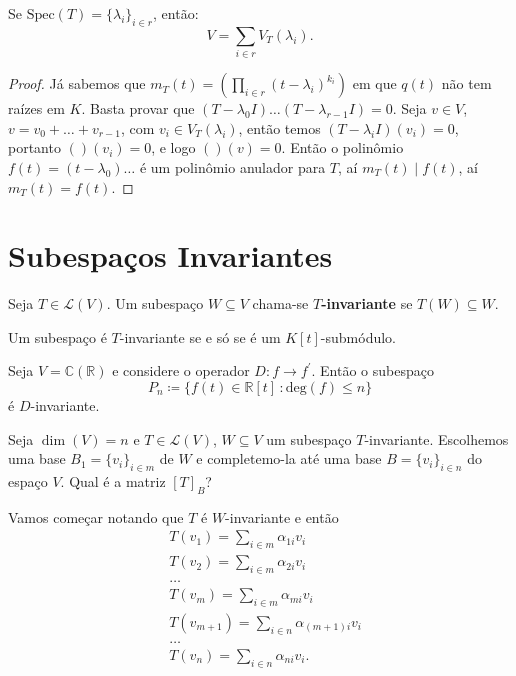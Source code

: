 \documentclass[11pt,twoside,a4paper]{book}
\begin{document}
\noindent
Se $\mathrm{Spec}(T)=\{\lambda_i\}_{i\in r}$, então:
\[
V=\sum_{i\in r}V_T(\lambda_i).
\]

\begin{proof}
Já sabemos que $m_T(t)=\left(\prod_{i\in r}(t-\lambda_i)^{k_i}\right)$ em que $q(t)$ não tem raízes em $K$. Basta provar que $(T-\lambda_0 I)\dots(T-\lambda_{r-1} I)=0$. Seja $v\in V$, $v=v_0+\dots+v_{r-1}$, com $v_i\in V_T(\lambda_i)$, então temos $(T-\lambda_i I)(v_i)=0$, portanto $()(v_i)=0$, e logo $()(v)=0$. Então o polinômio $f(t)=(t-\lambda_0)\dots$ é um polinômio anulador para $T$, aí $m_T(t)\mid f(t)$, aí $m_T(t)=f(t)$.
\end{proof}

\section{Subespaços Invariantes}

\begin{definicao}
Seja $T\in\mathcal{L}(V)$. Um subespaço $W\subseteq V$ chama-se \textbf{$T$-invariante} se $T(W)\subseteq W$.
\end{definicao}

\begin{observacao}
Um subespaço é $T$-invariante se e só se é um $K[t]$-submódulo.
\end{observacao}
\begin{exemplo}
Seja \(V=\mathbb{C}(\mathbb{R})\) e considere o operador \(D\colon f\to
f^\prime\). Então o subespaço\[P_n\coloneqq\{f(t)\in\mathbb{R}[t]\,\colon
  \text{deg}(f)\leq n\}\] é \(D\)-invariante. 
\end{exemplo}
  \noindent
Seja $\dim(V)=n$ e $T\in\mathcal{L}(V)$, $W\subseteq V$ um subespaço
$T$-invariante. Escolhemos uma base $B_1=\{v_i\}_{i\in m}$ de $W$ e
completemo-la até uma base $B=\{v_i\}_{i\in n}$ do espaço $V$. Qual é a matriz
$[T]_B$?

Vamos começar notando que \(T\) é \(W\)-invariante e então 
\begin{align*}
&T(v_1)=\sum_{i\in m}\alpha_{1i}v_i\\&T(v_2)=\sum_{i\in m}\alpha_{2i}v_i\\&\ldots\\&T(v_m)=\sum_{i\in m}\alpha_{mi}v_i\\&T(v_{m+1})=\sum_{i\in n}\alpha_{(m+1)i}v_i\\&\ldots\\&T(v_n)=\sum_{i\in n}\alpha_{ni}v_i.
\end{align*}
\end{document}
